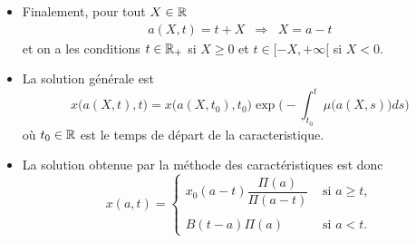 \begin{frame}
    \begin{itemize}
        \item Finalement, pour tout $X \in \mathbb{R}$
        \begin{eqnarray*}
            a(X,t) = t+X &\Longrightarrow& X = a-t
        \end{eqnarray*}
        et on a les conditions $t \in \mathbb{R}_+$ si $X \geq 0$ et $t \in [-X,+\infty[$ si $X<0$. \pause
        \item La solution générale est
        \begin{equation*}
            x\big(a(X,t),t\big) = x\big(a(X,t_0),t_0\big)\exp\bigg(-\int_{t_0}^t\mu\big(a(X,s)\big)d s\bigg)
        \end{equation*}
        où $t_0 \in \mathbb{R}$ est le temps de départ de la caracteristique. \pause
        \item La solution obtenue par la méthode des caractéristiques est donc
        \begin{equation*}
            x(a,t) = \left\{\begin{array}{lc}
                x_0(a - t)\dfrac{\Pi(a)}{\Pi(a-t)} & \text{ si } a \geq t, \\
                & \\
                B(t-a)\Pi(a) & \text{ si } a < t.
            \end{array}\right.
        \end{equation*}
    \end{itemize}
\end{frame}

